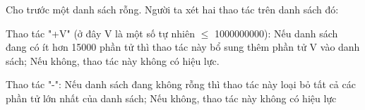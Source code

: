 Cho trước một danh sách rỗng. Người ta xét hai thao tác  trên danh sách đó:  

   Thao tác "+V" (ở đây V là một số tự nhiên  $\le$  1000000000): Nếu danh sách đang có ít hơn 15000 phần tử thì thao tác này bổ sung thêm phần tử V vào danh sách; Nếu không, thao tác này không có hiệu lực.  

   Thao tác "-": Nếu danh sách đang không rỗng thì thao tác này loại bỏ tất cả các phần tử lớn nhất của danh sách; Nếu không, thao tác này không có hiệu lực  

\